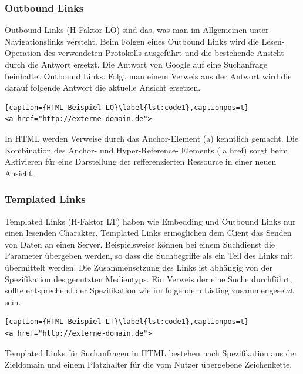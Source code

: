 \subsubsection{Outbound Links}
Outbound Links (H-Faktor LO) sind das, was man im Allgemeinen unter Navigationslinks versteht. Beim Folgen eines Outbound Links wird die Lesen-Operation des verwendeten Protokolls ausgeführt und die bestehende Ansicht durch die Antwort ersetzt. Die Antwort von Google auf eine Suchanfrage beinhaltet Outbound Links. Folgt man einem Verweis aus der Antwort wird die darauf folgende Antwort die aktuelle Ansicht ersetzen.\\
\begin{lstlisting}[caption={HTML Beispiel LO}\label{lst:code1},captionpos=t]
<a href="http://externe-domain.de">
\end{lstlisting}
In HTML werden Verweise durch das Anchor-Element (a) kenntlich gemacht. Die Kombination des Anchor- und Hyper-Reference- Elements ( a href) sorgt beim Aktivieren für eine Darstellung der refferenzierten Ressource in einer neuen Ansicht. 



\subsubsection{Templated Links}
Templated Links (H-Faktor LT) haben wie Embedding und Outbound Links nur einen lesenden Charakter. Templated Links ermöglichen dem Client das Senden von Daten an einen Server. Beispielsweise können bei einem Suchdienst die Parameter übergeben werden, so dass die Suchbegriffe als ein Teil des Links mit übermittelt werden. Die Zusammensetzung des Links ist abhängig von der Spezifikation des genutzten Medientyps. Ein Verweis der eine Suche durchführt, sollte entsprechend der Spezifikation wie im folgendem Listing zusammengesetzt sein.\\
\begin{lstlisting}[caption={HTML Beispiel LT}\label{lst:code1},captionpos=t]
<a href="http://externe-domain.de">
\end{lstlisting}
Templated Links für Suchanfragen in HTML bestehen nach Spezifikation aus der Zieldomain und einem Platzhalter für die vom Nutzer übergebene Zeichenkette.




